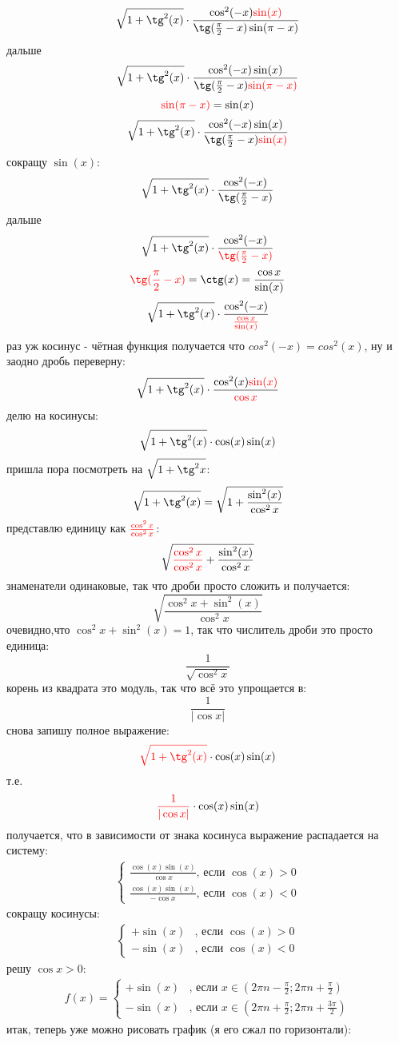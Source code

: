 \documentclass{article}
\begin{document}
$$\sqrt{1+\tg^2(x)}\cdot\frac{\cos^2(-x){\color{red}\sin(x)}}{\tg(\frac{\pi}{2}-x)\sin(\pi-x)}$$
дальше
$$\sqrt{1+\tg^2(x)}\cdot\frac{\cos^2(-x)\sin(x)}{\tg(\frac{\pi}{2}-x){\color{red}\sin(\pi-x)}}$$
$${\color{red}\sin(\pi-x)}=\sin(x)$$
$$\sqrt{1+\tg^2(x)}\cdot\frac{\cos^2(-x)\sin(x)}{\tg(\frac{\pi}{2}-x){\color{red}\sin(x)}}$$
сокращу $\sin(x)$:
$$\sqrt{1+\tg^2(x)}\cdot\frac{\cos^2(-x)}{\tg(\frac{\pi}{2}-x)}$$
дальше
$$\sqrt{1+\tg^2(x)}\cdot\frac{\cos^2(-x)}{\color{red}\tg(\frac{\pi}{2}-x)}$$
$${\color{red}\tg(\frac{\pi}{2}-x)}=\ctg(x)=\frac{\cos{x}}{\sin(x)}$$
$$\sqrt{1+\tg^2(x)}\cdot\frac{\cos^2(-x)}{\color{red}\frac{\cos{x}}{\sin(x)}}$$
раз уж косинус - чётная функция получается что $cos^2{(-x)}=cos^2{(x)}$, ну и заодно дробь переверну:
$$\sqrt{1+\tg^2(x)}\cdot\frac{\cos^2(x){\color{red}\sin(x)}}{\color{red}\cos{x}}$$
делю на косинусы:
$$\sqrt{1+\tg^2(x)}\cdot\cos(x)\sin(x)$$
пришла пора посмотреть на $\sqrt{1+\tg^2{x}}$:
$$\sqrt{1+\tg^2(x)}=\sqrt{1+\frac{\sin^2(x)}{\cos^2{x}}}$$
представлю единицу как $\color{red}\frac{\cos^2{x}}{\cos^2{x}}$:
$$\sqrt{{\color{red}\frac{\cos^2{x}}{\cos^2{x}} }+\frac{\sin^2(x)}{\cos^2{x}}}$$
знаменатели одинаковые, так что дроби просто сложить и получается:
$$\sqrt{\frac{\cos^2{x}+\sin^2(x)}{\cos^2{x}}}$$
очевидно,что $\cos^2{x}+\sin^2(x)=1$, так что числитель дроби это просто единица:
$$\frac{1}{\sqrt{\cos^2{x}}}$$
корень из квадрата это модуль, так что всё это упрощается в:
$$\frac{1}{|\cos{x}|}$$
снова запишу полное выражение:
$${\color{red}\sqrt{1+\tg^2(x)} }\cdot\cos(x)\sin(x)$$
т.е.
$${\color{red}\frac{1}{|\cos{x}|} }\cdot\cos(x)\sin(x)$$
получается, что в зависимости от знака косинуса выражение распадается на систему:
\begin{align}
    \begin{cases}
    \frac{\cos(x)\sin(x)}{\cos{x}}\textrm{, если }\cos(x)>0\\
    \frac{\cos(x)\sin(x)}{-\cos{x}}\textrm{, если }\cos(x)<0
    \end{cases}
\end{align}
сокращу косинусы:
\begin{align}
    \begin{cases}
    +\sin(x)&\textrm{, если }\cos(x)>0\\
    -\sin(x)&\textrm{, если }\cos(x)<0
    \end{cases}
\end{align}
решу $\cos{x}>0$:
\begin{align}
    f(x)=\begin{cases}
    +\sin(x) & \textrm{, если }x\in(2\pi{}n-\frac{\pi}{2};2\pi{}n+\frac{\pi}{2})\\
    -\sin(x) & \textrm{, если }x\in(2\pi{}n+\frac{\pi}{2};2\pi{}n+\frac{3\pi}{2})
    \end{cases}
\end{align}
итак, теперь уже можно рисовать график (я его сжал по горизонтали):
\end{document}
